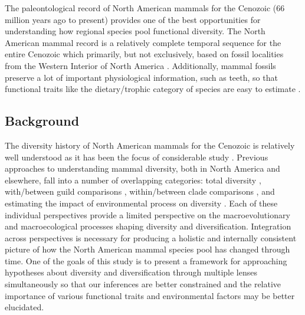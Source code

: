 \documentclass[12pt,letterpaper]{article}
\begin{document}
The paleontological record of North American mammals for the Cenozoic (66 million years ago to present) provides one of the best opportunities for understanding how regional species pool functional diversity. The North American mammal record is a relatively complete temporal sequence for the entire Cenozoic which primarily, but not exclusively, based on fossil localities from the Western Interior of North America \citep{Alroy1996a,Alroy2000g,Alroy2009}. Additionally, mammal fossils preserve a lot of important physiological information, such as teeth, so that functional traits like the dietary/trophic category of species are easy to estimate \citep{Polly2015a,Polly2011b,Eronen2010a}.

\subsection*{Background}

The diversity history of North American mammals for the Cenozoic is relatively well understood as it has been the focus of considerable study \citep{Alroy2009,Alroy1996a,Janis1993b,Alroy2000g,Figueirido2012,Pires2015a,Fraser2015a,Smits2015b,Quental2013,Slater2015c,Silvestro2015b,Badgley2013,Blois2009,Janis1993c}. Previous approaches to understanding mammal diversity, both in North America and elsewhere, fall into a number of overlapping categories: total diversity \citep{Alroy2000g,Alroy1996a,Figueirido2012,Liow2008}, with/between guild comparisons \citep{Janis2004,Janis2000,Jernvall2004,Janis1993c,Pires2015a,Janis2008a}, within/between clade comparisons \citep{Quental2013,Slater2015c,Silvestro2015b,Fraser2015a,Cantalapiedra2017}, and estimating the impact of environmental process on diversity \citep{Blois2009,Janis1993c,Janis1993b,Fraser2015a,Eronen2015,Badgley2013,Badgley2017,Alroy2000g}. Each of these individual perspectives provide a limited perspective on the macroevolutionary and macroecological processes shaping diversity and diversification. Integration across perspectives is necessary for producing a holistic and internally consistent picture of how the North American mammal species pool has changed through time. One of the goals of this study is to present a framework for approaching hypotheses about diversity and diversification through multiple lenses simultaneously so that our inferences are better constrained and the relative importance of various functional traits and environmental factors may be better elucidated.
\end{document}
